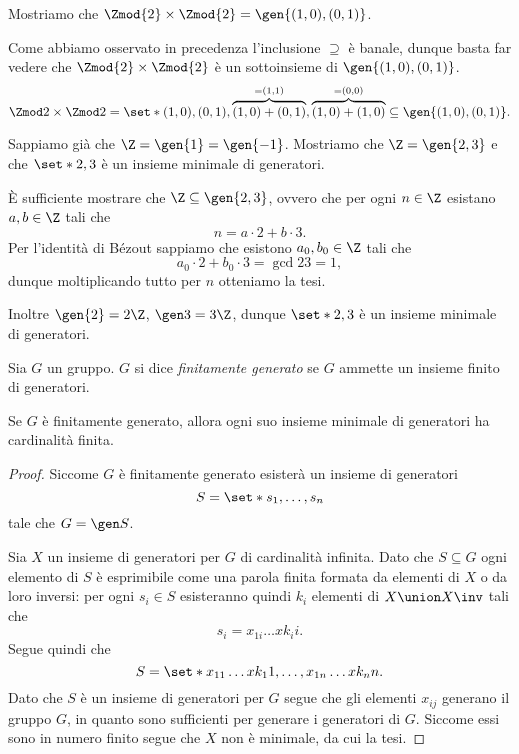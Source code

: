 \begin{example}
    Mostriamo che $\Zmod{2} \times \Zmod{2} = \gen{(1, 0), (0, 1)}$.

    Come abbiamo osservato in precedenza l'inclusione $\supseteq$ è banale, dunque basta far vedere che $\Zmod{2} \times \Zmod{2}$ è un sottoinsieme di $\gen{(1, 0), (0, 1)}$.
    \[
        \Zmod 2 \times \Zmod 2 = \set*{(1, 0), (0, 1), \overbrace{(1, 0) + (0, 1)}^{= (1, 1)}, \overbrace{(1, 0) + (1, 0)}^{= (0, 0)}} \subseteq \gen{(1, 0), (0, 1)}.
    \]
\end{example}

\begin{example}
    Sappiamo già che $\Z = \gen{1} = \gen{-1}$. Mostriamo che $\Z = \gen{2, 3}$ e che $\set*{2, 3}$ è un insieme minimale di generatori.

    È sufficiente mostrare che $\Z \subseteq \gen{2, 3}$, ovvero che per ogni $n \in \Z$ esistano $a, b \in \Z$ tali che \[
        n = a\cdot 2 + b \cdot 3.    
    \] Per l'identità di Bézout sappiamo che esistono $a_0, b_0 \in \Z$ tali che \[
        a_0\cdot 2 + b_0 \cdot 3 = \gcd{2}{3} = 1,    
    \] dunque moltiplicando tutto per $n$ otteniamo la tesi.

    Inoltre $\gen{2} = 2\Z$, $\gen 3 = 3\Z$, dunque $\set*{2, 3}$ è un insieme minimale di generatori.
\end{example}

\begin{definition}
    Sia $G$ un gruppo. $G$ si dice \emph{finitamente generato} se $G$ ammette un insieme finito di generatori.
\end{definition}

\begin{proposition}
    Se $G$ è finitamente generato, allora ogni suo insieme minimale di generatori ha cardinalità finita.
\end{proposition}
\begin{proof}
    Siccome $G$ è finitamente generato esisterà un insieme di generatori \[
        S = \set*{s_1, \dots, s_n}    
    \] tale che $G = \gen S$.

    Sia $X$ un insieme di generatori per $G$ di cardinalità infinita. Dato che $S \subseteq G$ ogni elemento di $S$ è esprimibile come una parola finita formata da elementi di $X$ o da loro inversi: per ogni $s_i \in S$ esisteranno quindi $k_i$ elementi di $X \union X\inv$ tali che \[
        s_i = x_{1i}\dots x{k_ii}.
    \] Segue quindi che \[
        S = \set*{x_{11}\dots x{k_11}, \dots, x_{1n}\dots x{k_nn}}.
    \] Dato che $S$ è un insieme di generatori per $G$ segue che gli elementi $x_{ij}$ generano il gruppo $G$, in quanto sono sufficienti per generare i generatori di $G$. Siccome essi sono in numero finito segue che $X$ non è minimale, da cui la tesi.
\end{proof}

